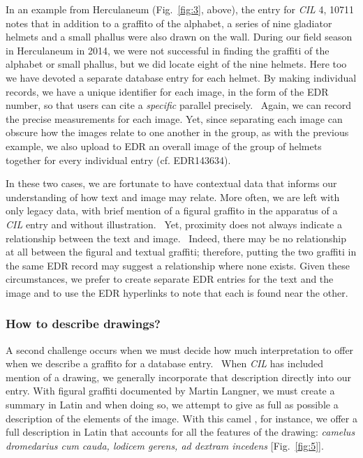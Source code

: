 \documentclass[amsthm,ebook]{saparticle}
\begin{document}
In an example from Herculaneum (Fig.~\ref{fig:3}, above), the entry for \emph{CIL} 4, 10711 notes that in addition to a graffito of the
alphabet, a series of nine gladiator helmets and a small phallus were also drawn on the wall. During our field season
in Herculaneum in 2014, we were not successful in finding the graffiti of the alphabet or small phallus, but we did
locate eight of the nine helmets. Here too we have devoted a separate database entry for each helmet. By making
individual records, we have a unique identifier for each image, in the form of the EDR number, so that users can cite a
\emph{specific} parallel precisely. \ Again, we can record the precise measurements for each image. Yet, since separating
each image can obscure how the images relate to one another in the group, as with the previous example, we also upload
to EDR an overall image of the group of helmets together for every individual entry (cf. EDR143634).

In these two cases, we are fortunate to have contextual data that informs our understanding of how text and image may
relate. More often, we are left with only legacy data, with brief mention of a figural graffito in the apparatus of a
\emph{CIL} entry and without illustration. \ Yet, proximity does not always indicate a relationship between the text and
image. \ Indeed, there may be no relationship at all between the figural and textual graffiti; therefore, putting the
two graffiti in the same EDR record may suggest a relationship where none exists. Given these circumstances, we prefer
to create separate EDR entries for the text and the image and to use the EDR hyperlinks to note that each is found near
the other.




\subsubsection{How to describe drawings? }


A second challenge occurs when we must decide how much interpretation to offer when we describe a graffito for a
database entry. \ When \emph{CIL} has included mention of a drawing, we generally incorporate that description directly into
our entry. With figural graffiti documented by Martin Langner, we must create a summary in Latin and when doing so, we
attempt to give as full as possible a description of the elements of the image. With this camel \citep[n. 1443]{langner_antike_2001}, for instance, we offer a full description in Latin that accounts for all the features of the drawing: \emph{camelus dromedarius cum cauda, lodicem gerens, ad dextram incedens} [Fig.~\ref{fig:5}].
\end{document}
